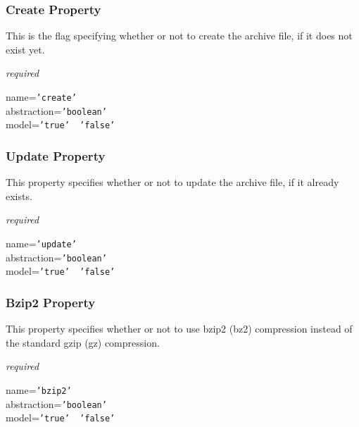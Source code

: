 \subsubsection{Create Property}

This is the flag specifying whether or not to create the archive file, if it
does not exist yet.

\emph{required}

name=\texttt{'create'}\\
abstraction=\texttt{'boolean'}\\
model=\texttt{'true' \vline\ 'false'}

\subsubsection{Update Property}

This property specifies whether or not to update the archive file, if it
already exists.

\emph{required}

name=\texttt{'update'}\\
abstraction=\texttt{'boolean'}\\
model=\texttt{'true' \vline\ 'false'}

\subsubsection{Bzip2 Property}

This property specifies whether or not to use bzip2 (bz2) compression instead
of the standard gzip (gz) compression.

\emph{required}

name=\texttt{'bzip2'}\\
abstraction=\texttt{'boolean'}\\
model=\texttt{'true' \vline\ 'false'}
